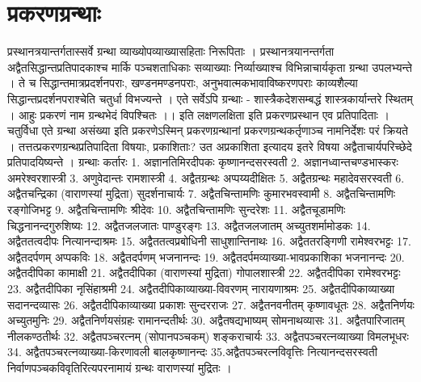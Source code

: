 \chapter{प्रकरणग्रन्थाः }
प्रस्थानत्रयान्तर्गतास्सर्वे ग्रन्था व्याख्योपव्याख्यासहिताः निरूपिताः । प्रस्थानत्रयानन्तर्गता अद्वैतसिद्धान्तप्रतिपादकाश्च मार्कि पञ्चशताधिकाः सव्याख्याः निर्व्याख्याश्च विभिन्नाचार्यकृता ग्रन्था उपलभ्यन्ते । ते च सिद्धान्तमात्रप्रदर्शनपराः, खण्डनमण्डनपराः, अनुभवात्मकभावाविष्करणपराः काव्यशैल्या सिद्धान्तप्रदर्शनपराश्चेति चतुर्धा विभज्यन्ते । एते सर्वेऽपि ग्रन्थाः -
शास्त्रैकदेशसम्बद्धं शास्त्रकार्यान्तरे स्थितम् ।
आहुः प्रकरणं नाम ग्रन्थभेदं विपश्चितः ।। 
इति लक्षणलक्षिता इति प्रकरणप्रस्थान एव प्रतिपादिताः । चतुर्विधा एते ग्रन्था असंख्या इति प्रकरणेऽस्मिन् प्रकरणग्रन्थानां प्रकरणग्रन्थकर्तृणाञ्च नामनिर्देशः परं क्रियते । तत्तत्प्रकरणग्रन्थप्रतिपादिता विषयाः, प्रकाशिताः? उत अप्रकाशिता इत्यादय इतरे विषया अद्वैताचार्यपरिच्छेदे प्रतिपादयिष्यन्ते । 
		ग्रन्थाः 										कर्तारः
1. अज्ञानतिमिरदीपकः 					कृष्णानन्दसरस्वती
2. अज्ञानध्वान्तचण्डभास्करः 			अमरेश्वरशास्त्री
3. अणुवेदान्तः 							रामशास्त्री
4. अद्वैतग्रन्थः								अप्पय्यदीक्षितः
5. अद्वैतग्रन्थः								महादेवसरस्वती
6. अद्वैतचन्द्रिका (वाराणस्यां मुद्रिता)	सुदर्शनाचार्यः
7. अद्वैतचिन्तामणिः						कुमारभवस्वामी
8. अद्वैतचिन्तामणिः						रङ्गोजिभट्ट
9. अद्वैतचिन्तामणिः						श्रीदेवः
10. अद्वैतचिन्तामणिः						सुन्दरेशः
11. अद्वैतचूडामणिः						चिद्धनानन्दगुरुशिष्यः
12. अद्वैतजलजातः						पाण्डुरङ्गः
13. अद्वैतजलजातम्						अच्युतशर्मामोडकः
14. अद्वैततत्वदीपः						नित्यानन्दाश्रमः 
15. अद्वैततत्वप्रबोधिनी					साधुशान्तिनाथः
16. अद्वैततरङ्गिणी						रामेश्वरभट्टः
17. अद्वैतदर्पणम् 							अप्पकविः
18. अद्वैतदर्पणम् 							भजनानन्दः
19. अद्वैतदर्पमव्याख्या-भावप्रकाशिका	भजनानन्दः
20. अद्वैतदीपिका						कामाक्षी
21. अद्वैतदीपिका (वाराणस्यां मुद्रिता)	गोपालशास्त्री
22. अद्वैतदीपिका 						रामेश्वरभट्टः
23. अद्वैतदीपिका 						नृसिंहाश्रमी
24. अद्वैतदीपिकाव्याख्या-विवरणम्	नारायणाश्रमः 
25. अद्वैतदीपिकाव्याख्या				सदानन्दव्यासः
26. अद्वैतदीपिकाव्याख्या प्रकाशः		सुन्दरराजः
27. अद्वैतनवनीतम् 						कृष्णावधूतः 
28. अद्वैतनिर्णयः							अच्युतमुनिः
29. अद्वैतनिर्णयसंग्रहः					रामानन्दतीर्थः
30. अद्वैतषद्यभाष्यम् 					सोमनाथव्यासः
31. अद्वैतपारिजातम् 						नीलकण्ठतीर्थः
32. अद्वैतपञ्चरत्नम् (सोपानपञ्चकम्) 	शङ्कराचार्यः
33. अद्वैतपञ्चरत्नव्याख्या 				विमलभूधरः
34. अद्वैतपञ्चरत्नव्याख्या-किरणावली	बालकृष्णानन्दः 
35.अद्वैतपञ्चरत्नविवृत्तिः				नित्यानन्दसरस्वती
	  निर्वाणपञ्चकविवृतिरित्यपरनामायं ग्रन्थः वाराणस्यां मुद्रितः ।
	  
